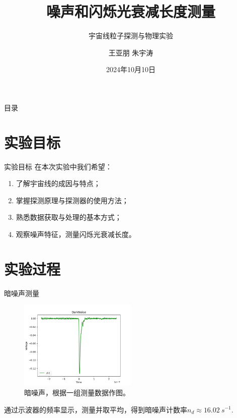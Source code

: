 \documentclass[10pt]{beamer}
\author{王亚朋 \quad 朱宇涛}
\date{2024年10月10日}
\title{噪声和闪烁光衰减长度测量}
\subtitle{宇宙线粒子探测与物理实验}
\begin{document}
\maketitle
\begin{frame}[label={sec:orgc00309b}]{目录}
\tableofcontents
\end{frame}
\section{实验目标}
\label{sec:orge4e0772}
\begin{frame}[label={sec:org8956bac}]{实验目标}
在本次实验中我们希望\cite{高能宇宙线粒子探测:online}：
\begin{enumerate}
\item 了解宇宙线的成因与特点；
\item 掌握探测原理与探测器的使用方法；
\item 熟悉数据获取与处理的基本方式；
\item 观察噪声特征，测量闪烁光衰减长度。
\end{enumerate}
\end{frame}
\section{实验过程}
\label{sec:org8e580e9}
\begin{frame}[label={sec:org675057c}]{暗噪声测量}
\begin{figure}[htbp]
\centering
\includegraphics[width=0.5\textwidth]{../AttenuationLength/figs/DarkNoise.png}
\caption{暗噪声，根据一组测量数据作图。}
\end{figure}

通过示波器的频率显示，测量并取平均，得到暗噪声计数率\(n_d \approx \qty{16.02}{s^{-1}}\).
\end{frame}
\end{document}
